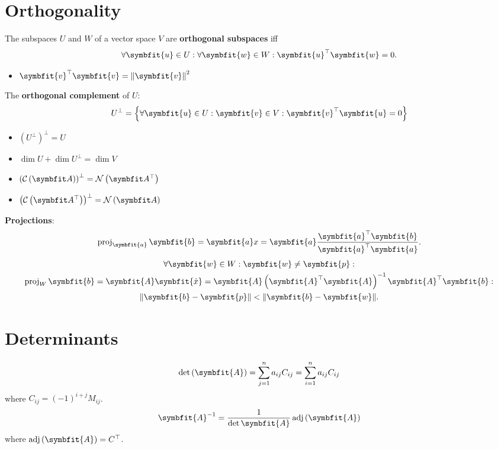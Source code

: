 \documentclass{article}
\begin{document}
\begin{minipage}[t]{62.39259259mm}
    \section*{Orthogonality}
    The subspaces \(U\) and \(W\) of a vector space \(V\) are
    \textbf{orthogonal subspaces} iff
    \begin{equation*}
        \forall \symbfit{u}\in U:\forall \symbfit{w}\in W:\symbfit{u}^{\top}\symbfit{w} = 0.
    \end{equation*}
    \begin{itemize}
        \item \(\symbfit{v}^\top \symbfit{v}=\norm{\symbfit{v}}^2\)
    \end{itemize}
    The \textbf{orthogonal complement} of \(U\):
    \begin{equation*}
        U^{\perp} = \left\{ \forall \symbfit{u}\in U:\symbfit{v}\in V: \symbfit{v}^{\top}\symbfit{u}=0 \right\}
    \end{equation*}
    \begin{itemize}
        \item \(\left( U^{\perp} \right)^{\perp} = U\)
        \item \(\dim{U} + \dim{U^{\perp}} = \dim{V}\)
        \item \(\left( \columnspace{A} \right)^\perp = \leftnullspace{A}\)
        \item \(\left( \rowspace{A} \right)^\perp = \nullspace{A}\)
    \end{itemize}
    \textbf{Projections}:
    \begin{equation*}
        \proj_{\symbfit{a}}\symbfit{b}
        = \symbfit{a} x
        = \symbfit{a} \frac{\symbfit{a}^\top \symbfit{b}}{\symbfit{a}^\top \symbfit{a}}.
    \end{equation*}
    \begin{gather*}
        \forall \symbfit{w}\in W:\symbfit{w}\neq \symbfit{p}: \\
        \proj_{W}\symbfit{b} = \symbfit{A}\symbfit{\hat{x}} = \symbfit{A}\left( \symbfit{A}^\top \symbfit{A} \right)^{-1}\symbfit{A}^\top \symbfit{b}: \\
        \norm{\symbfit{b}-\symbfit{p}}<\norm{\symbfit{b}-\symbfit{w}}.
    \end{gather*}
    \section*{Determinants}
    \begin{equation*}
        \det{\left( \symbfit{A} \right)} = \sum_{j=1}^n a_{ij}C_{ij} = \sum_{i=1}^n a_{ij}C_{ij}
    \end{equation*}
    where \(C_{ij}=\left( -1 \right)^{i+j}M_{ij}\).
    \begin{equation*}
        \symbfit{A}^{-1}=\frac{1}{\det{\symbfit{A}}} \adj{\left( \symbfit{A} \right)}
    \end{equation*}
    where \(\adj{\left( \symbfit{A} \right)}=C^\top\).
\end{minipage}\hfill%
\end{document}
